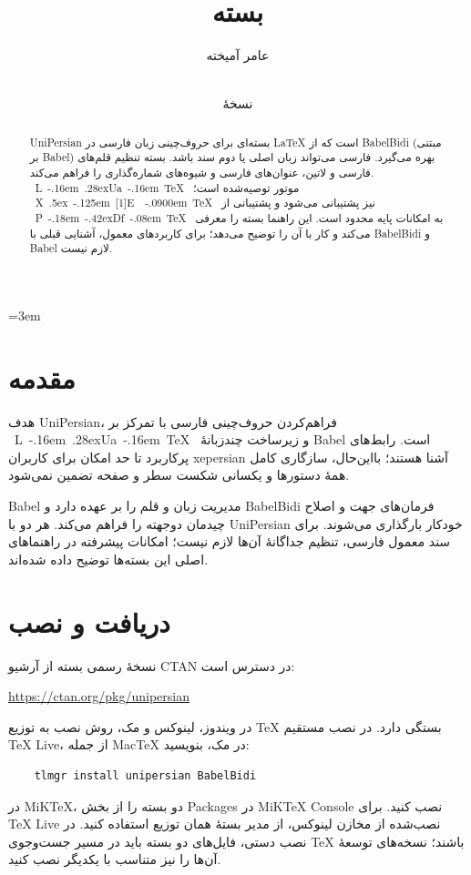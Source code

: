 \documentclass{article}
\title{بسته \code{UniPersian}}
\author{عامر آمیخته}
\date{%
\localedate[calendar=persian,convert]
{\pkgmeta[year]{unipersian}}
{\pkgmeta[month]{unipersian}}
{\pkgmeta[day]{unipersian}}\\[2pt]
نسخهٔ \lr{\pkgmeta[version]{unipersian}}
}
\def\XeTeX{XeTeX}%
\def\PdfTeX{pdfTeX}%
\def\LuaTeX{LuaTeX}%
\def\code#1{#1}%
\def\lr#1{#1}%
\newcommand{\code}[1]{\lr{\texttt{\small #1}}}
\def\XeTeX{%
\leavevmode
\hbox{%
    X%
    \lower.5ex\hbox{%
        \kern-.125em
        \scalebox{-1}[1]{E}%
    }%
    \kern-.0900em
    \TeX
}%
}
\def\PdfTeX{%
\leavevmode
\hbox{%
    P%
    \kern-.18em
    \raise-.42ex\hbox{\scriptsize Df}%
    \kern-.08em
    \TeX
}%
}
\def\LuaTeX{%
\leavevmode
\hbox{%
    L%
    \kern-.16em
    \raise.28ex\hbox{\scriptsize Ua}%
    \kern-.16em
    \TeX
}%
}
\begin{document}
\emergencystretch=3em
\maketitle

\begin{abstract}
\code{UniPersian}
 بسته‌ای برای حروف‌چینی زبان فارسی در \LaTeX{} است که از
 \code{BabelBidi} (مبتنی بر \code{Babel}) بهره می‌گیرد.
    فارسی
    می‌تواند زبان اصلی یا دوم سند باشد. بسته تنظیم قلم‌های فارسی و
    لاتین، عنوان‌های فارسی و شیوه‌های شماره‌گذاری را فراهم می‌کند.
    \LuaTeX{} موتور توصیه‌شده است؛ \XeTeX{} نیز پشتیبانی می‌شود و
    پشتیبانی از \PdfTeX{} به امکانات پایه محدود است. 
این راهنما بسته را معرفی می‌کند و کار با آن را توضیح می‌دهد؛
برای کاربردهای معمول، آشنایی قبلی با
\code{BabelBidi}
و
\code{Babel}
 لازم نیست.

\end{abstract}


\tableofcontents

\section{مقدمه}

هدف \code{UniPersian}، فراهم‌کردن حروف‌چینی فارسی با تمرکز بر
\LuaTeX{} و زیرساخت چندزبانهٔ \code{Babel} است. رابط‌های پرکاربرد
تا حد امکان برای کاربران \code{xepersian} آشنا هستند؛ بااین‌حال،
سازگاری کامل همهٔ دستورها و یکسانی شکست سطر و صفحه تضمین نمی‌شود.

\code{Babel} مدیریت زبان و قلم را بر عهده دارد و \code{BabelBidi}
فرمان‌های جهت و اصلاح چیدمان دوجهته را فراهم می‌کند. هر دو با
\code{UniPersian} خودکار بارگذاری می‌شوند. برای سند معمول فارسی،
تنظیم جداگانهٔ آن‌ها لازم نیست؛ امکانات پیشرفته در راهنماهای اصلی
این بسته‌ها توضیح داده شده‌اند.

\section{دریافت و نصب}

نسخهٔ رسمی بسته از آرشیو \code{CTAN} در دسترس است:
\begin{center}
    \url{https://ctan.org/pkg/unipersian}
\end{center}

در ویندوز، لینوکس و مک، روش نصب به توزیع \TeX{} بستگی دارد.
در نصب مستقیم \TeX{} Live، از جمله \code{MacTeX} در مک، بنویسید:
\begin{verbatim}
    tlmgr install unipersian BabelBidi
\end{verbatim}
در \code{MiKTeX}، دو بسته را از بخش \code{Packages} در
\code{MiKTeX Console} نصب کنید. برای \TeX{} Live نصب‌شده از
مخازن لینوکس، از مدیر بستهٔ همان توزیع استفاده کنید. در نصب دستی،
فایل‌های دو بسته باید در مسیر جست‌وجوی \TeX{} باشند؛ نسخه‌های
توسعهٔ آن‌ها را نیز متناسب با یکدیگر نصب کنید.
\end{document}
